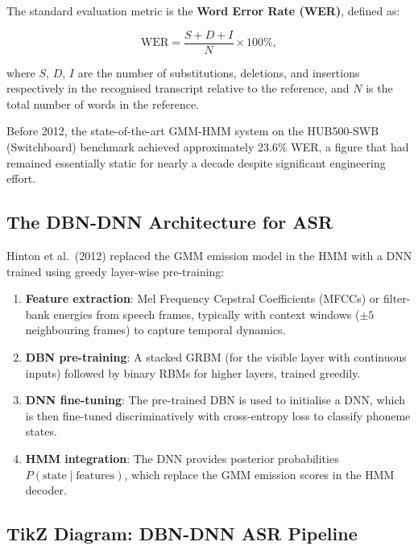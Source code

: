 \documentclass[12pt,a4paper]{article}
\begin{document}
The standard evaluation metric is the \textbf{Word Error Rate (WER)}, defined
as:

\begin{equation}
  \text{WER} = \frac{S + D + I}{N} \times 100\%,
  \label{eq:wer}
\end{equation}

where $S$, $D$, $I$ are the number of substitutions, deletions, and insertions
respectively in the recognised transcript relative to the reference, and $N$ is
the total number of words in the reference.

Before 2012, the state-of-the-art GMM-HMM system on the HUB500-SWB (Switchboard)
benchmark achieved approximately 23.6\% WER, a figure that had remained
essentially static for nearly a decade despite significant engineering effort.

\subsection{The DBN-DNN Architecture for ASR}

Hinton et al.\ (2012) replaced the GMM emission model in the HMM with a
DNN trained using greedy layer-wise pre-training:

\begin{enumerate}[leftmargin=*, label=\arabic*.]
  \item \textbf{Feature extraction}: Mel Frequency Cepstral Coefficients
        (MFCCs) or filter-bank energies from speech frames, typically with
        context windows ($\pm 5$ neighbouring frames) to capture temporal
        dynamics.
  \item \textbf{DBN pre-training}: A stacked GRBM (for the visible layer
        with continuous inputs) followed by binary RBMs for higher layers,
        trained greedily.
  \item \textbf{DNN fine-tuning}: The pre-trained DBN is used to initialise
        a DNN, which is then fine-tuned discriminatively with cross-entropy
        loss to classify phoneme states.
  \item \textbf{HMM integration}: The DNN provides posterior probabilities
        $P(\text{state} \mid \text{features})$, which replace the GMM
        emission scores in the HMM decoder.
\end{enumerate}

\subsection{TikZ Diagram: DBN-DNN ASR Pipeline}
\end{document}
